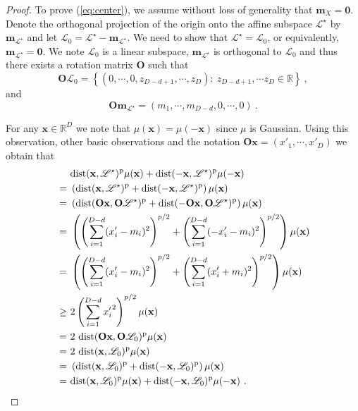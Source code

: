 \documentclass{article} \usepackage{iclr2020_conference,times}
\def\eqref#1{(\ref{#1})}
\def\LL{{\mathscr{L}}}
\def\rvm{{\mathbf{m}}}
\def\rvx{{\mathbf{x}}}
\def\rmO{{\mathbf{O}}}
\newcommand{\R}{\mathbb{R}}
\begin{document}
\begin{proof}
To prove \eqref{eq:center}, we assume without loss of generality that $\rvm_X = \mathbf{0}$. Denote the orthogonal projection of the origin onto the affine subspace $\LL^{\star}$ by $\rvm_{\LL^{\star}}$
and let $\LL_0 = \LL^{\star} - \rvm_{\LL^{\star}}$. We need to show that 
$\LL^{\star} = \LL_0$, or equivalently, $\rvm_{\LL^{\star}} = \mathbf{0}$. We note $\LL_0$ is a linear subspace, $\rvm_{\LL^{\star}}$ is orthogonal to  $\LL_0$ and thus there exists a rotation matrix $\rmO$ such that 
\begin{equation}\label{eq:wlogl}
    \rmO \LL_0 = \left\{ (0, \cdots, 0, z_{D-d+1}, \cdots, z_D):~ z_{D-d+1}, \cdots z_D \in \R \right\} ~,
\end{equation}
and
\begin{equation}\label{eq:wlogm}
    \rmO \rvm_{\LL^{\star}} = (m_1, \cdots, m_{D-d}, 0, \cdots, 0) ~.
\end{equation}

For any $\rvx \in \R^D$ we note that $\mu(\rvx) = \mu(-\rvx)$ since $\mu$ is Gaussian. Using this observation, other basic observations and the notation $\rmO \rvx = (x'_1, \cdots, x'_D)$ we obtain that
\allowdisplaybreaks
\begin{align}
    & \rm{dist}(\rvx,\LL^{\star})^p \mu(\rvx) + \rm{dist}(-\rvx, \LL^{\star})^p \mu(-\rvx) \nonumber \\
~=~ & \left( \rm{dist}(\rvx,\LL^{\star})^p + \rm{dist}(-\rvx, \LL^{\star})^p \right) \mu(\rvx) \nonumber \\
~=~ & \left( \rm{dist}(\rmO \rvx, \rmO \LL^{\star})^p + \rm{dist}(- \rmO \rvx, \rmO \LL^{\star})^p \right) \mu(\rvx) \nonumber \\
~=~ & \left( \left( \sum_{i=1}^{D-d} (x'_i - m_i)^2 \right)^{p/2} + \left( \sum_{i=1}^{D-d} ( - x'_i - m_i)^2 \right)^{p/2} \right) \mu(\rvx) \nonumber \\
~=~ & \left( \left( \sum_{i=1}^{D-d} (x'_i - m_i)^2 \right)^{p/2} + \left( \sum_{i=1}^{D-d} ( x'_i + m_i)^2 \right)^{p/2} \right) \mu(\rvx) \nonumber \\
~\geq~ & 2 \left( \sum_{i=1}^{D-d} {x'_i}^2 \right)^{p/2} \mu(\rvx) \label{eq:convex}\\
~=~ & 2 ~ \rm{dist}(\rmO \rvx, \rmO \LL_0)^p \mu(\rvx) \nonumber \\
~=~ & 2 ~ \rm{dist}(\rvx, \LL_0)^p \mu(\rvx) \nonumber \\
~=~ & \left( \rm{dist}(\rvx, \LL_0)^p + \rm{dist}(-\rvx, \LL_0)^p \right) \mu(\rvx) \nonumber \\
~=~ & \rm{dist}(\rvx,\LL_0)^p \mu(\rvx) + \rm{dist}(-\rvx, \LL_0)^p \mu(-\rvx) ~. \nonumber
\end{align}


\end{proof}
\end{document}
